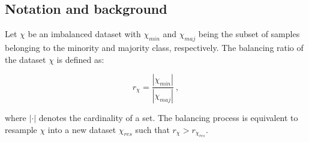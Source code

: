 \documentclass[twoside,11pt]{article}
\begin{document}
\subsection{Notation and background}

Let $\chi$ be an imbalanced dataset with $\chi_{min}$ and $\chi_{maj}$ being the subset of samples belonging to the minority and majority class, respectively.
The balancing ratio of the dataset $\chi$ is defined as:

\begin{equation}
  r_{\chi} = \frac{|\chi_{min}|}{|\chi_{maj}|} \ ,
\end{equation}

\noindent where $|\cdot|$ denotes the cardinality of a set. The balancing process is equivalent to resample $\chi$ into a new dataset $\chi_{res}$ such that $r_{\chi} > r_{\chi_{res}}$.
\end{document}
